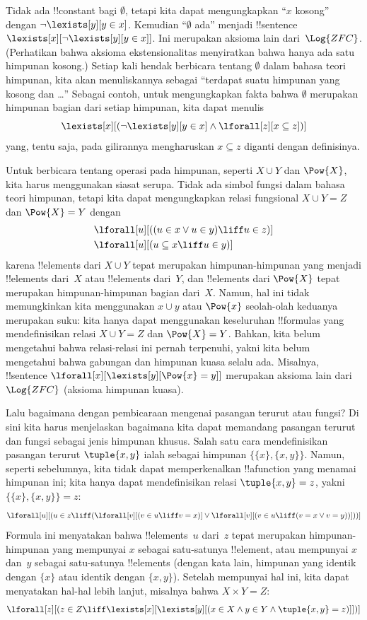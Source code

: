 \documentclass[../../../include/open-logic-section]{subfiles}
\begin{document}
Tidak ada !!{constant} bagi $\emptyset$, tetapi kita dapat mengungkapkan
``$x$ kosong'' dengan $\lnot \lexists[y][y \in x]$. Kemudian
``$\emptyset$ ada'' menjadi !!{sentence}~$\lexists[x][\lnot
\lexists[y][y \in x]]$. Ini merupakan aksioma lain dari~$\Log{ZFC}$.
(Perhatikan bahwa aksioma ekstensionalitas menyiratkan bahwa hanya ada satu
himpunan kosong.) Setiap kali hendak berbicara tentang $\emptyset$ dalam
bahasa teori himpunan, kita akan menuliskannya sebagai ``terdapat suatu
himpunan yang kosong dan \dots'' Sebagai contoh, untuk mengungkapkan fakta
bahwa $\emptyset$ merupakan himpunan bagian dari setiap himpunan, kita dapat
menulis
\[
\lexists[x][(\lnot\lexists[y][y \in x] \land \lforall[z][x \subseteq
    z])]
\]
yang, tentu saja, pada gilirannya mengharuskan $x \subseteq z$ diganti dengan
definisinya.

Untuk berbicara tentang operasi pada himpunan, seperti $X \cup Y$ dan
$\Pow{X}$, kita harus menggunakan siasat serupa. Tidak ada simbol fungsi dalam
bahasa teori himpunan, tetapi kita dapat mengungkapkan relasi fungsional
$X \cup Y = Z$ dan $\Pow{X} = Y$ dengan
\begin{align*}
& \lforall[u][((u \in x \lor u \in y) \liff u \in z)]\\
& \lforall[u][(u \subseteq x \liff u \in y )]
\end{align*}
karena !!{element}s dari $X \cup Y$ tepat merupakan himpunan-himpunan yang
menjadi !!{element}s dari~$X$ atau !!{element}s dari~$Y$, dan !!{element}s
dari $\Pow{X}$ tepat merupakan himpunan-himpunan bagian dari~$X$. Namun, hal
ini tidak memungkinkan kita menggunakan $x \cup y$ atau $\Pow{x}$ seolah-olah
keduanya merupakan suku: kita hanya dapat menggunakan keseluruhan !!{formula}s
yang mendefinisikan relasi $X \cup Y = Z$ dan $\Pow{X} = Y$. Bahkan, kita
belum mengetahui bahwa relasi-relasi ini pernah terpenuhi, yakni kita belum
mengetahui bahwa gabungan dan himpunan kuasa selalu ada. Misalnya,
!!{sentence} $\lforall[x][\lexists[y][\Pow{x} = y]]$ merupakan aksioma lain
dari~$\Log{ZFC}$ (aksioma himpunan kuasa).

Lalu bagaimana dengan pembicaraan mengenai pasangan terurut atau fungsi? Di
sini kita harus menjelaskan bagaimana kita dapat memandang pasangan terurut
dan fungsi sebagai jenis himpunan khusus. Salah satu cara mendefinisikan
pasangan terurut $\tuple{x, y}$ ialah sebagai himpunan
$\{\{x\}, \{x, y\}\}$. Namun, seperti sebelumnya, kita tidak dapat
memperkenalkan !!a{function} yang menamai himpunan ini; kita hanya dapat
mendefinisikan relasi $\tuple{x, y} = z$, yakni
$\{\{x\}, \{x, y\}\} = z$:
\[
\lforall[u][(u \in z \liff (\lforall[v][(v \in u \liff v = x)] \lor
  \lforall[v][(v \in u \liff (v = x \lor v = y))]))]
\]
Formula ini menyatakan bahwa !!{element}s~$u$ dari~$z$ tepat merupakan
himpunan-himpunan yang mempunyai $x$ sebagai satu-satunya !!{element}, atau
mempunyai $x$ dan~$y$ sebagai satu-satunya !!{element}s (dengan kata lain,
himpunan yang identik dengan $\{x\}$ atau identik dengan $\{x, y\}$). Setelah
mempunyai hal ini, kita dapat menyatakan hal-hal lebih lanjut, misalnya bahwa
$X \times Y = Z$:
\[
\lforall[z][(z \in Z \liff \lexists[x][\lexists[y][(x \in
        X \land y \in Y \land \tuple{x, y} = z)]])]
\]
\end{document}
